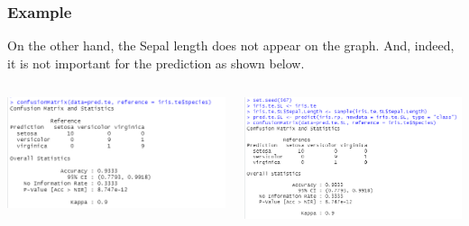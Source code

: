 \begin{frame}
\frametitle{Example}
On the other hand, the Sepal length does not appear on the graph. And, indeed, it is not important for the prediction as shown below.\\
\vspace{0.2cm}
\begin{columns}
\begin{column}{0.5\textwidth}
\includegraphics[width=6.5cm]{../Graphs/VarImp_iris_acc_orig.png}
\end{column}
\begin{column}{0.5\textwidth}
\includegraphics[width=6.5cm]{../Graphs/VarImp_iris_acc_SLsh.png}
\end{column}
\end{columns}
\end{frame}
